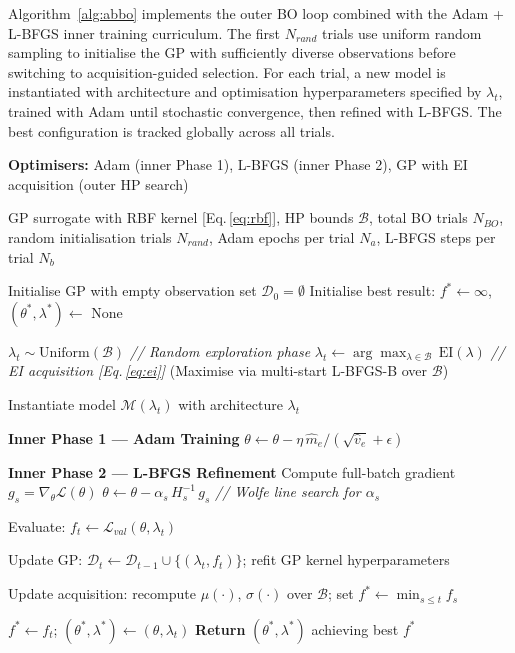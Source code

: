 \documentclass[11pt]{article}
\begin{document}
Algorithm~\ref{alg:abbo} implements the outer BO loop combined with
the Adam + L-BFGS inner training curriculum.  The first $N_{rand}$
trials use uniform random sampling to initialise the GP with
sufficiently diverse observations before switching to acquisition-guided
selection.  For each trial, a new model is instantiated with
architecture and optimisation hyperparameters specified by $\lambda_t$,
trained with Adam until stochastic convergence, then refined with
L-BFGS.  The best configuration is tracked globally across all trials.

\begin{algorithm}[H]
\caption{Method B — Hybrid ABBO}
\label{alg:abbo}
\textbf{Optimisers:} Adam (inner Phase 1), L-BFGS (inner Phase 2),
GP with EI acquisition (outer HP search)
\begin{algorithmic}[1]
\Require GP surrogate with RBF kernel [Eq.\,\eqref{eq:rbf}],
         HP bounds $\mathcal{B}$,
         total BO trials $N_{BO}$,
         random initialisation trials $N_{rand}$,
         Adam epochs per trial $N_a$,
         L-BFGS steps per trial $N_b$

\State Initialise GP with empty observation set $\mathcal{D}_0 = \emptyset$
\State Initialise best result: $f^* \leftarrow \infty$,
       $(\theta^*, \lambda^*) \leftarrow$ None

    \State $\lambda_t \sim \mathrm{Uniform}(\mathcal{B})$
           \hfill \textit{// Random exploration phase}
  \Else
    \State $\lambda_t \leftarrow \arg\max_{\lambda \in \mathcal{B}}\,\mathrm{EI}(\lambda)$
           \hfill \textit{// EI acquisition [Eq.\,\eqref{eq:ei}]}
    \State (Maximise via multi-start L-BFGS-B over $\mathcal{B}$)
  \EndIf

  \State Instantiate model $\mathcal{M}(\lambda_t)$ with architecture $\lambda_t$

  \State \textbf{Inner Phase 1 — Adam Training}
    \State $\theta \leftarrow \theta - \eta\,\hat{m}_e / (\sqrt{\hat{v}_e}+\epsilon)$
  \EndFor

  \State \textbf{Inner Phase 2 — L-BFGS Refinement}
    \State Compute full-batch gradient $g_s = \nabla_\theta\mathcal{L}(\theta)$
    \State $\theta \leftarrow \theta - \alpha_s\,H_s^{-1}\,g_s$
           \hfill \textit{// Wolfe line search for $\alpha_s$}
  \EndFor

  \State Evaluate: $f_t \leftarrow \mathcal{L}_{val}(\theta, \lambda_t)$

  \State Update GP: $\mathcal{D}_t \leftarrow \mathcal{D}_{t-1} \cup \{(\lambda_t, f_t)\}$;
         refit GP kernel hyperparameters

  \State Update acquisition: recompute $\mu(\cdot)$, $\sigma(\cdot)$
         over $\mathcal{B}$; set $f^* \leftarrow \min_{s \le t} f_s$

    \State $f^* \leftarrow f_t$;
           $(\theta^*, \lambda^*) \leftarrow (\theta, \lambda_t)$
  \EndIf
\EndFor
\State \textbf{Return} $(\theta^*, \lambda^*)$ achieving best $f^*$
\end{algorithmic}
\end{algorithm}
\end{document}
